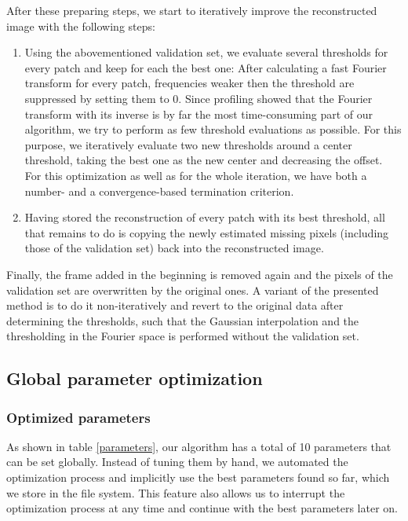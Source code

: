 \documentclass[10pt,conference,compsocconf]{IEEEtran}
\begin{document}
After these preparing steps, we start to iteratively improve the reconstructed image with the following steps:
\begin{enumerate}
\item Using the abovementioned validation set, we evaluate several thresholds for every patch and keep for each the best one: After calculating a fast Fourier transform for every patch, frequencies weaker then the threshold are suppressed by setting them to 0. Since profiling showed that the Fourier transform with its inverse is by far the most time-consuming part of our algorithm, we try to perform as few threshold evaluations as possible. For this purpose, we iteratively evaluate two new thresholds around a center threshold, taking the best one as the new center and decreasing the offset. For this optimization as well as for the whole iteration, we have both a number- and a convergence-based termination criterion.
\item Having stored the reconstruction of every patch with its best threshold, all that remains to do is copying the newly estimated missing pixels (including those of the validation set) back into the reconstructed image.
\end{enumerate}
Finally, the frame added in the beginning is removed again and the pixels of the validation set are overwritten by the original ones. A variant of the presented method is to do it non-iteratively and revert to the original data after determining the thresholds, such that the Gaussian interpolation and the thresholding in the Fourier space is performed without the validation set.

\subsection{Global parameter optimization}
\subsubsection{Optimized parameters}
As shown in table \ref{parameters}, our algorithm has a total of 10 parameters that can be set globally. Instead of tuning them by hand, we automated the optimization process and implicitly use the best parameters found so far, which we store in the file system. This feature also allows us to interrupt the optimization process at any time and continue with the best parameters later on.
\end{document}
